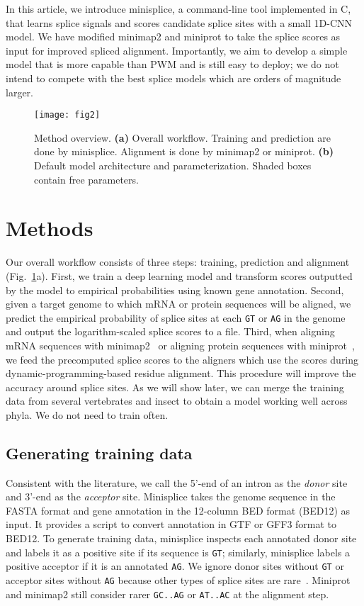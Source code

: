 \documentclass[webpdf,contemporary,large,namedate]{oup-authoring-template}%
\begin{document}
In this article, we introduce minisplice, a command-line tool implemented in C,
that learns splice signals and scores candidate splice sites with a small 1D-CNN model.
We have modified minimap2 and miniprot to take the splice scores as input for improved spliced alignment.
Importantly, we aim to develop a simple model that is more capable than PWM and is still easy to deploy;
we do not intend to compete with the best splice models which are orders of magnitude larger.

\begin{figure}[tb]
\texttt{[image: fig2]}
\caption{Method overview. {\bf (a)} Overall workflow.
Training and prediction are done by minisplice.
Alignment is done by minimap2 or miniprot.
{\bf (b)} Default model architecture and parameterization.
Shaded boxes contain free parameters.}\label{fig:wf}
\end{figure}

\section{Methods}

Our overall workflow consists of three steps: training, prediction and alignment (Fig.~\ref{fig:wf}a).
First, we train a deep learning model and transform scores outputted by the model
to empirical probabilities using known gene annotation.
Second, given a target genome to which mRNA or protein sequences will be aligned,
we predict the empirical probability of splice sites at each {\tt GT} or {\tt AG} in the genome
and output the logarithm-scaled splice scores to a file.
Third, when aligning mRNA sequences with minimap2~\citep{Li:2018ab} or aligning protein sequences with miniprot~\citep{Li:2023ab},
we feed the precomputed splice scores to the aligners which use the scores during dynamic-programming-based residue alignment.
This procedure will improve the accuracy around splice sites.
As we will show later, we can merge the training data from several vertebrates and insect
to obtain a model working well across phyla.
We do not need to train often.

\subsection{Generating training data}

Consistent with the literature, we call the 5'-end of an intron as the \emph{donor} site
and 3'-end as the \emph{acceptor} site.
Minisplice takes the genome sequence in the FASTA format
and gene annotation in the 12-column BED format (BED12) as input.
It provides a script to convert annotation in GTF or GFF3 format to BED12.
To generate training data, minisplice inspects each annotated donor site and labels it as a positive site if its sequence is {\tt GT};
similarly, minisplice labels a positive acceptor if it is an annotated {\tt AG}.
We ignore donor sites without {\tt GT} or acceptor sites without {\tt AG}
because other types of splice sites are rare~\citep{Sibley:2016vh}.
Miniprot and minimap2 still consider rarer {\tt GC..AG} or {\tt AT..AC} at the alignment step.
\end{document}
